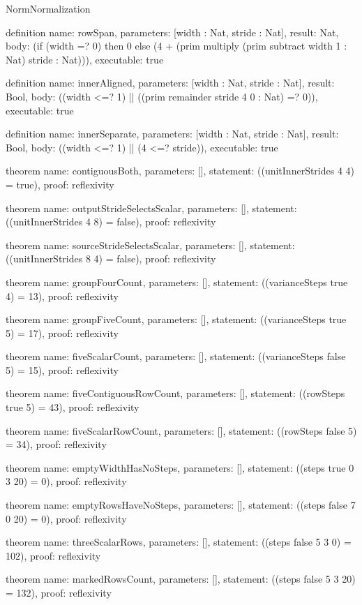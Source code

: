 \begin{lexlean}{NormNormalization}
\begin{semanticmodule}
definition{
  name: rowSpan,
  parameters: [width : Nat, stride : Nat],
  result: Nat,
  body: (if (width =? 0) then 0 else (4 + (prim multiply (prim subtract width 1 : Nat) stride : Nat))),
  executable: true
}

definition{
  name: innerAligned,
  parameters: [width : Nat, stride : Nat],
  result: Bool,
  body: ((width <=? 1) || ((prim remainder stride 4 0 : Nat) =? 0)),
  executable: true
}

definition{
  name: innerSeparate,
  parameters: [width : Nat, stride : Nat],
  result: Bool,
  body: ((width <=? 1) || (4 <=? stride)),
  executable: true
}

theorem{
  name: contiguousBoth,
  parameters: [],
  statement: ((unitInnerStrides 4 4) = true),
  proof: reflexivity{}
}

theorem{
  name: outputStrideSelectsScalar,
  parameters: [],
  statement: ((unitInnerStrides 4 8) = false),
  proof: reflexivity{}
}

theorem{
  name: sourceStrideSelectsScalar,
  parameters: [],
  statement: ((unitInnerStrides 8 4) = false),
  proof: reflexivity{}
}

theorem{
  name: groupFourCount,
  parameters: [],
  statement: ((varianceSteps true 4) = 13),
  proof: reflexivity{}
}

theorem{
  name: groupFiveCount,
  parameters: [],
  statement: ((varianceSteps true 5) = 17),
  proof: reflexivity{}
}

theorem{
  name: fiveScalarCount,
  parameters: [],
  statement: ((varianceSteps false 5) = 15),
  proof: reflexivity{}
}

theorem{
  name: fiveContiguousRowCount,
  parameters: [],
  statement: ((rowSteps true 5) = 43),
  proof: reflexivity{}
}

theorem{
  name: fiveScalarRowCount,
  parameters: [],
  statement: ((rowSteps false 5) = 34),
  proof: reflexivity{}
}

theorem{
  name: emptyWidthHasNoSteps,
  parameters: [],
  statement: ((steps true 0 3 20) = 0),
  proof: reflexivity{}
}

theorem{
  name: emptyRowsHaveNoSteps,
  parameters: [],
  statement: ((steps false 7 0 20) = 0),
  proof: reflexivity{}
}

theorem{
  name: threeScalarRows,
  parameters: [],
  statement: ((steps false 5 3 0) = 102),
  proof: reflexivity{}
}

theorem{
  name: markedRowsCount,
  parameters: [],
  statement: ((steps false 5 3 20) = 132),
  proof: reflexivity{}
}


\end{semanticmodule}
\end{lexlean}
